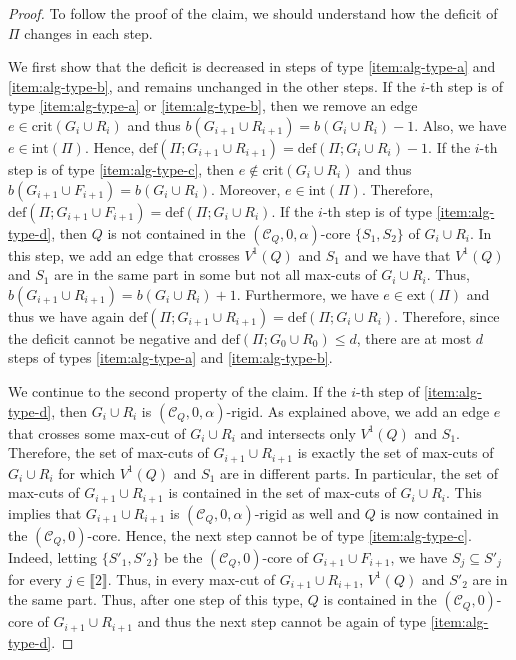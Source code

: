 \documentclass[11pt,a4paper,oneside,reqno]{amsart}
\newcommand{\cC}{\mathcal{C}}
\newcommand{\1}{\mathbbm{1}} %
\newcommand{\br}[1]{\llbracket{#1}\rrbracket}
\renewcommand{\le}{\leqslant}
\newcommand{\deficit}{\mathrm{def}}
\newcommand{\ext}{\mathrm{ext}}
\renewcommand{\int}{\mathrm{int}}
\newcommand{\crit}{\mathrm{crit}}
\begin{document}
\begin{proof}
    To follow the proof of the claim, we should understand how the deficit of $\Pi$ changes in each step.

    We first show that the deficit is decreased in steps of type \ref{item:alg-type-a} and \ref{item:alg-type-b}, and remains unchanged in the other steps. If the $i$-th step is of type \ref{item:alg-type-a} or \ref{item:alg-type-b}, then we remove an edge $e \in \crit(G_i \cup R_i)$ and thus $b(G_{i+1} \cup R_{i+1}) = b(G_i \cup R_i) - 1$. Also, we have $e \in \int(\Pi)$. Hence, $\deficit(\Pi; G_{i+1} \cup R_{i+1}) = \deficit(\Pi; G_i \cup R_i) - 1$. If the $i$-th step is of type \ref{item:alg-type-c}, then $e \notin \crit(G_i \cup R_i)$ and thus $b(G_{i+1} \cup F_{i+1}) = b(G_i \cup R_i)$. Moreover, $e \in \int(\Pi)$. Therefore, $\deficit(\Pi; G_{i+1} \cup F_{i+1}) = \deficit(\Pi; G_i \cup R_i)$. If the $i$-th step is of type \ref{item:alg-type-d}, then $Q$ is not contained in the $(\cC_Q, 0, \alpha)$-core $\{S_1, S_2\}$ of $G_i \cup R_i$. In this step, we add an edge that crosses $V^1(Q)$ and $S_1$ and we have that $V^1(Q)$ and $S_1$ are in the same part in some but not all max-cuts of $G_i \cup R_i$. Thus, $b(G_{i+1} \cup R_{i+1}) = b(G_i \cup R_i) + 1$. Furthermore, we have $e \in \ext(\Pi)$ and thus we have again $\deficit(\Pi; G_{i+1} \cup R_{i+1}) = \deficit(\Pi; G_i \cup R_i)$. Therefore, since the deficit cannot be negative and $\deficit(\Pi; G_0 \cup R_0) \le d$, there are at most $d$ steps of types \ref{item:alg-type-a} and \ref{item:alg-type-b}.

    We continue to the second property of the claim. If the $i$-th step of \ref{item:alg-type-d}, then $G_i \cup R_i$ is $(\cC_Q, 0, \alpha)$-rigid. As explained above, we add an edge $e$ that crosses some max-cut of $G_i \cup R_i$ and intersects only $V^1(Q)$ and $S_1$. Therefore, the set of max-cuts of $G_{i+1} \cup R_{i+1}$ is exactly the set of max-cuts of $G_i \cup R_i$ for which $V^1(Q)$ and $S_1$ are in different parts. In particular, the set of max-cuts of $G_{i+1} \cup R_{i+1}$ is contained in the set of max-cuts of $G_i \cup R_i$. This implies that $G_{i+1} \cup R_{i+1}$ is $(\cC_Q, 0, \alpha)$-rigid as well and $Q$ is now contained in the $(\cC_Q, 0)$-core. Hence, the next step cannot be of type \ref{item:alg-type-c}. Indeed, letting $\{S'_1, S'_2\}$ be the $(\cC_Q, 0)$-core of $G_{i+1} \cup F_{i+1}$, we have $S_j \subseteq S'_j$ for every $j \in \br{2}$. Thus, in every max-cut of $G_{i+1} \cup R_{i+1}$, $V^1(Q)$ and $S'_2$ are in the same part. Thus, after one step of this type, $Q$ is contained in the $(\cC_Q, 0)$-core of $G_{i+1} \cup R_{i+1}$ and thus the next step cannot be again of type \ref{item:alg-type-d}.
\end{proof}
\end{document}
